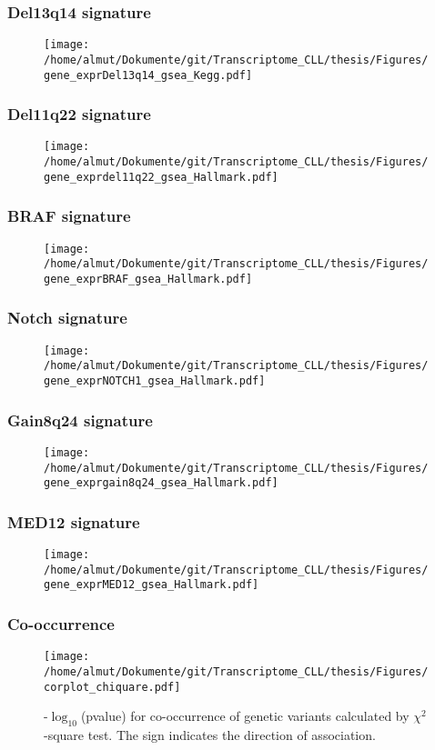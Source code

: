 \documentclass[xcolor=dvipsnames,t,10pt]{beamer}
\begin{document}
%
%
\begin{frame}[c]
	\frametitle{Del13q14 signature}
	\begin{figure}
		\centering
		\texttt{[image: /home/almut/Dokumente/git/Transcriptome\_CLL/thesis/Figures/gene\_exprDel13q14\_gsea\_Kegg.pdf]}
	\end{figure}
\end{frame}
%
%
\begin{frame}[c]
	\frametitle{Del11q22 signature}
	\begin{figure}
		\centering
		\texttt{[image: /home/almut/Dokumente/git/Transcriptome\_CLL/thesis/Figures/gene\_exprdel11q22\_gsea\_Hallmark.pdf]}
	\end{figure}
\end{frame}
%
% 
\begin{frame}[c]
	\frametitle{BRAF signature}
	\begin{figure}
		\centering
		\texttt{[image: /home/almut/Dokumente/git/Transcriptome\_CLL/thesis/Figures/gene\_exprBRAF\_gsea\_Hallmark.pdf]}
	\end{figure}
\end{frame}
%
% 
\begin{frame}[c]
	\frametitle{Notch signature}
	\begin{figure}
		\centering
		\texttt{[image: /home/almut/Dokumente/git/Transcriptome\_CLL/thesis/Figures/gene\_exprNOTCH1\_gsea\_Hallmark.pdf]}
	\end{figure}
\end{frame}
%
% 
\begin{frame}[c]
	\frametitle{Gain8q24 signature}
	\begin{figure}
		\centering
		\texttt{[image: /home/almut/Dokumente/git/Transcriptome\_CLL/thesis/Figures/gene\_exprgain8q24\_gsea\_Hallmark.pdf]}
	\end{figure}
\end{frame}
%
% 
\begin{frame}[c]
	\frametitle{MED12 signature}
	\begin{figure}
		\centering
		\texttt{[image: /home/almut/Dokumente/git/Transcriptome\_CLL/thesis/Figures/gene\_exprMED12\_gsea\_Hallmark.pdf]}
	\end{figure}
\end{frame}
%
%
\begin{frame}[c]
	\frametitle{Co-occurrence}
	\begin{figure}
		\centering
		\texttt{[image: /home/almut/Dokumente/git/Transcriptome\_CLL/thesis/Figures/corplot\_chiquare.pdf]}
		\caption{-$\log_{10}$(pvalue) for co-occurrence of genetic variants calculated by $\chi^2$-square test. The sign indicates the direction of association.}
	\end{figure}
\end{frame}
\end{document}
